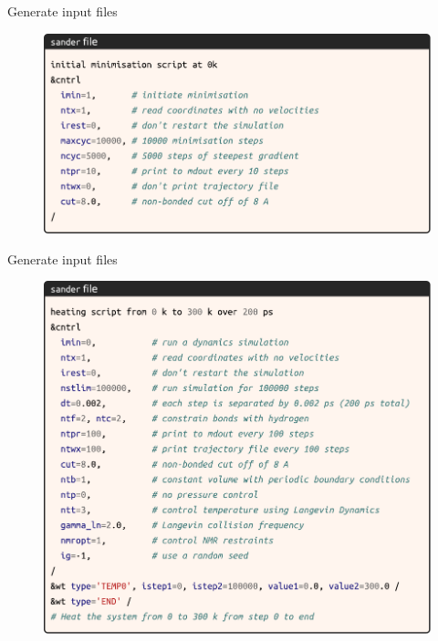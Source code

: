 \begin{frame}{Generate input files}
\begin{figure}
\includegraphics[height=0.7\textheight]{figures/dynamics/min.pdf}
\end{figure}
\end{frame}

\begin{frame}{Generate input files}
\begin{figure}
\includegraphics[height=0.8\textheight]{figures/dynamics/heat.pdf}
\end{figure}
\end{frame}

